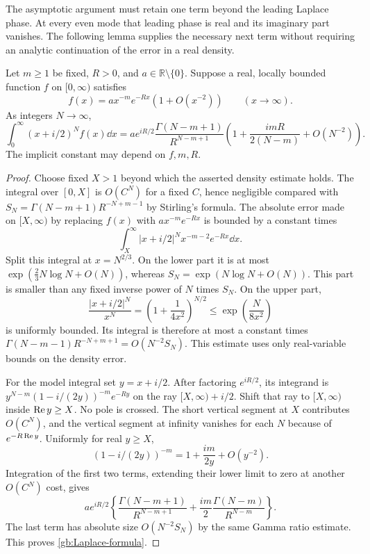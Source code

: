 The asymptotic argument must retain one term beyond the leading
Laplace phase.  At every even mode that leading phase is real and
its imaginary part vanishes.  The following lemma supplies the
necessary next term without requiring an analytic continuation of
the error in a real density.

\begin{lemma}\label{gb:Laplace}
Let $m\ge1$ be fixed, $R>0$, and $a\in\mathbb R\setminus\{0\}$.
Suppose a real, locally bounded function $f$ on $[0,\infty)$ satisfies
\[
             f(x)=ax^{-m}e^{-Rx}(1+O(x^{-2}))\qquad(x\to\infty).
\]
As integers $N\to\infty$,
\begin{equation}\label{gb:Laplace-formula}
 \int_0^\infty(x+i/2)^Nf(x)\dd x
 =ae^{iR/2}\frac{\Gamma(N-m+1)}{R^{N-m+1}}
       \left(1+\frac{imR}{2(N-m)}+O(N^{-2})\right).
\end{equation}
The implicit constant may depend on $f,m,R$.
\end{lemma}

\begin{proof}
Choose fixed $X>1$ beyond which the asserted density estimate holds.
The integral over $[0,X]$ is $O(C^N)$ for a fixed $C$, hence
negligible compared with
$S_N=\Gamma(N-m+1)R^{-N+m-1}$ by Stirling's formula.
The absolute error made on $[X,\infty)$ by replacing $f(x)$ with
$ax^{-m}e^{-Rx}$ is bounded by a constant times
\[
             \int_X^\infty|x+i/2|^Nx^{-m-2}e^{-Rx}\dd x.
\]
Split this integral at $x=N^{2/3}$.  On the lower part it is at most
$\exp(\tfrac23N\log N+O(N))$, whereas
$S_N=\exp(N\log N+O(N))$.  This part is smaller than any fixed
inverse power of $N$ times $S_N$.  On the upper part,
\[
 \frac{|x+i/2|^N}{x^N}
   =\left(1+\frac1{4x^2}\right)^{N/2}
   \le\exp\!\left(\frac{N}{8x^2}\right)
\]
is uniformly bounded.  Its integral is therefore at most a constant
times $\Gamma(N-m-1)R^{-N+m+1}=O(N^{-2}S_N)$.
This estimate uses only real-variable bounds on the density error.

For the model integral set $y=x+i/2$.  After factoring $e^{iR/2}$,
its integrand is
$y^{N-m}(1-i/(2y))^{-m}e^{-Ry}$ on the ray
$[X,\infty)+i/2$.  Shift that ray to $[X,\infty)$ inside
$\operatorname{Re} y\ge X$.  No pole is crossed.  The short vertical segment
at $X$ contributes $O(C^N)$, and the vertical segment at infinity
vanishes for each $N$ because of $e^{-R\operatorname{Re} y}$.
Uniformly for real $y\ge X$,
\[
                 (1-i/(2y))^{-m}=1+\frac{im}{2y}+O(y^{-2}).
\]
Integration of the first two terms, extending their lower limit to
zero at another $O(C^N)$ cost, gives
\[
 ae^{iR/2}\left\{
 \frac{\Gamma(N-m+1)}{R^{N-m+1}}
 +\frac{im}{2}\frac{\Gamma(N-m)}{R^{N-m}}\right\}.
\]
The last term has absolute size $O(N^{-2}S_N)$ by the same Gamma
ratio estimate.  This proves \eqref{gb:Laplace-formula}.
\end{proof}

